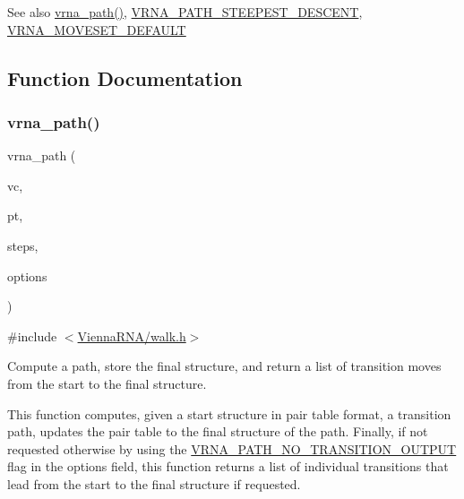 \begin{DoxySeeAlso}{See also}
\hyperlink{group__paths_gab6aee4143f8b103518d5cbfe6bfe5eae}{vrna\+\_\+path()}, \hyperlink{group__paths_ga705cea2b3243a38a2d6e3b1e141ed061}{V\+R\+N\+A\+\_\+\+P\+A\+T\+H\+\_\+\+S\+T\+E\+E\+P\+E\+S\+T\+\_\+\+D\+E\+S\+C\+E\+NT}, \hyperlink{group__neighbors_gaa5ffec4dd0d02df320f123e6888154d1}{V\+R\+N\+A\+\_\+\+M\+O\+V\+E\+S\+E\+T\+\_\+\+D\+E\+F\+A\+U\+LT} 
\end{DoxySeeAlso}


\subsection{Function Documentation}
\mbox{\label{group__paths_gab6aee4143f8b103518d5cbfe6bfe5eae}} 
\subsubsection{\texorpdfstring{vrna\+\_\+path()}{vrna\_path()}}
{\footnotesize\ttfamily vrna\+\_\+path (\begin{DoxyParamCaption}\item[{\hyperlink{group__fold__compound_ga1b0cef17fd40466cef5968eaeeff6166}{vrna\+\_\+fold\+\_\+compound\+\_\+t} $\ast$}]{vc,  }\item[{short $\ast$}]{pt,  }\item[{unsigned int}]{steps,  }\item[{unsigned int}]{options }\end{DoxyParamCaption})}



{\ttfamily \#include $<$\hyperlink{walk_8h}{Vienna\+R\+N\+A/walk.\+h}$>$}



Compute a path, store the final structure, and return a list of transition moves from the start to the final structure. 

This function computes, given a start structure in pair table format, a transition path, updates the pair table to the final structure of the path. Finally, if not requested otherwise by using the \hyperlink{group__paths_ga1ee63e54ecf136491e12ff03ede2622d}{V\+R\+N\+A\+\_\+\+P\+A\+T\+H\+\_\+\+N\+O\+\_\+\+T\+R\+A\+N\+S\+I\+T\+I\+O\+N\+\_\+\+O\+U\+T\+P\+UT} flag in the {\ttfamily options} field, this function returns a list of individual transitions that lead from the start to the final structure if requested.

